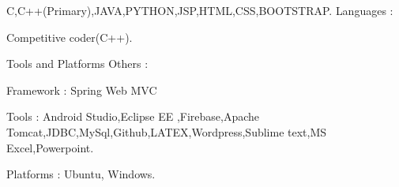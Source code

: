 \begin{cventries}
 \cventry
    {C,C++(Primary),JAVA,PYTHON,JSP,HTML,CSS,BOOTSTRAP.}
    {Languages :}
    {}
    {}
    {
      \begin{cvitems}
        \item {Competitive coder(C++).}
      \end{cvitems}
    }
\cventry
{Tools and Platforms}
{Others :}
{}
{}
{\begin{cvitems}
        \item{Framework : Spring Web MVC}
        \item {Tools : Android Studio,Eclipse EE ,Firebase,Apache Tomcat,JDBC,MySql,Github,LATEX,Wordpress,Sublime text,MS Excel,Powerpoint.}
        \item {Platforms : Ubuntu, Windows.}
\end{cvitems}
    }
\end{cventries}